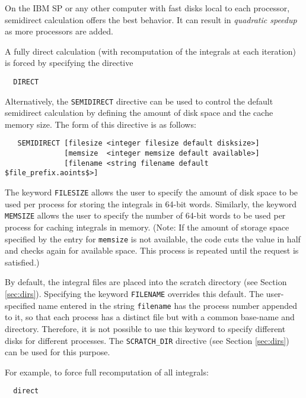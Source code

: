 
On the IBM SP or any other computer with fast disks local to each
processor, semidirect calculation offers the best behavior.  It can
result in {\em quadratic speedup} as more processors are added.  

A fully direct calculation (with recomputation of the integrals at
each iteration) is forced by specifying the directive

\begin{verbatim}
  DIRECT
\end{verbatim}

Alternatively, the \verb+SEMIDIRECT+ directive can be used to control
the default semidirect calculation by defining the amount of disk
space and the cache memory size.  The form of this directive is as
follows:

\begin{verbatim}
   SEMIDIRECT [filesize <integer filesize default disksize>] 
              [memsize  <integer memsize default available>]
              [filename <string filename default $file_prefix.aoints$>]
\end{verbatim}

The keyword \verb+FILESIZE+ allows the user to specify the amount of
disk space to be used per process for storing the integrals in 64-bit
words.  Similarly, the keyword \verb+MEMSIZE+ allows the user to
specify the number of 64-bit words to be used per process for caching
integrals in memory. (Note: If the amount of storage space specified
by the entry for \verb+memsize+ is not available, the code cuts the
value in half and checks again for available space.  This process is
repeated until the request is satisfied.)

By default, the integral files are placed into the scratch directory
(see Section \ref{sec:dirs}). Specifying the keyword \verb+FILENAME+
overrides this default.  The user-specified name entered in the string
\verb+filename+ has the process number appended to it, so that each
process has a distinct file but with a common base-name and directory.
Therefore, it is not possible to use this keyword to specify different
disks for different processes.  The \verb+SCRATCH_DIR+ directive (see
Section \ref{sec:dirs}) can be used for this purpose.

For example, to force full recomputation of all integrals:
\begin{verbatim}
  direct
\end{verbatim}


